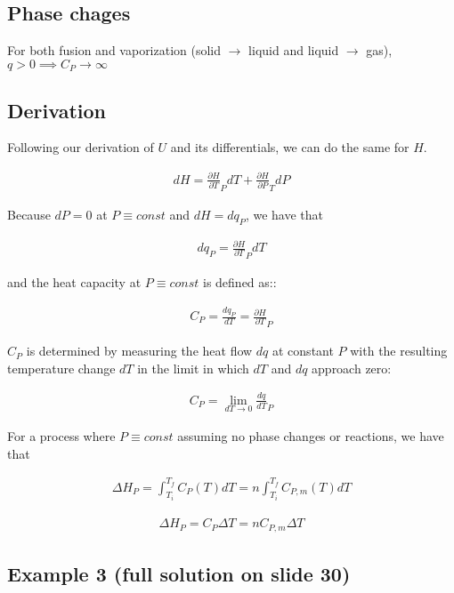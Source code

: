 \documentclass[12pt]{book}
\begin{document}
\subsection*{Phase chages}

For both fusion and vaporization (solid $\rightarrow$ liquid and liquid $\rightarrow$ gas), $q>0\implies C_P\rightarrow \infty$

\subsection*{Derivation}

Following our derivation of $U$ and its differentials, we can do the same for $H$.

\begin{align*}
    dH=\frac{\partial H}{\partial T}_P dT+\frac{\partial H}{\partial P}_T dP
\end{align*}

Because $dP=0$ at $P\equiv const$ and $dH=dq_P$, we have that

\begin{align*}
    dq_P=\frac{\partial H}{\partial T}_P dT
\end{align*}

and the heat capacity at $P\equiv const$ is defined as::

\begin{align*}
    C_P=\frac{dq_P}{dT}=\frac{\partial H}{\partial T}_P
\end{align*}

$C_P$ is determined by measuring the heat flow $dq$ at constant $P$ with the resulting temperature
change $dT$ in the limit in which $dT$ and $dq$ approach zero:

\begin{align*}
    C_P=\lim_{dT\rightarrow 0}\frac{dq}{dT}_P
\end{align*}

For a process where $P\equiv const$ assuming no phase changes or reactions, we have that

\begin{align*}
    \Delta H_P=\int_{T_i}^{T_f}C_P(T)dT=n\int_{T_i}^{T_f}C_{P,m}(T)dT
\end{align*}

\begin{align*}
    \Delta H_P=C_P\Delta T=nC_{P,m}\Delta T
\end{align*}

\subsection*{Example 3 (full solution on slide 30)}
\end{document}
